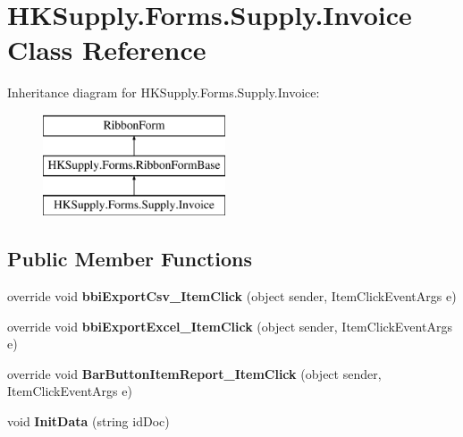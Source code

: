 \hypertarget{class_h_k_supply_1_1_forms_1_1_supply_1_1_invoice}{}\section{H\+K\+Supply.\+Forms.\+Supply.\+Invoice Class Reference}
\label{class_h_k_supply_1_1_forms_1_1_supply_1_1_invoice}
Inheritance diagram for H\+K\+Supply.\+Forms.\+Supply.\+Invoice\+:\begin{figure}[H]
\begin{center}
\leavevmode
\includegraphics[height=3.000000cm]{class_h_k_supply_1_1_forms_1_1_supply_1_1_invoice}
\end{center}
\end{figure}
\subsection*{Public Member Functions}
\begin{DoxyCompactItemize}
\item 
\mbox{\label{class_h_k_supply_1_1_forms_1_1_supply_1_1_invoice_a979428593ea34009a5ba17e72223d4e2}} 
override void {\bfseries bbi\+Export\+Csv\+\_\+\+Item\+Click} (object sender, Item\+Click\+Event\+Args e)
\item 
\mbox{\label{class_h_k_supply_1_1_forms_1_1_supply_1_1_invoice_aa5aeb6cfaf08afaaa507b69647104442}} 
override void {\bfseries bbi\+Export\+Excel\+\_\+\+Item\+Click} (object sender, Item\+Click\+Event\+Args e)
\item 
\mbox{\label{class_h_k_supply_1_1_forms_1_1_supply_1_1_invoice_a3572ffc2114fc9004f7d074f5bf37e6e}} 
override void {\bfseries Bar\+Button\+Item\+Report\+\_\+\+Item\+Click} (object sender, Item\+Click\+Event\+Args e)
\item 
\mbox{\label{class_h_k_supply_1_1_forms_1_1_supply_1_1_invoice_a406fd069dfe625324a39d71e6b2c5657}} 
void {\bfseries Init\+Data} (string id\+Doc)
\end{DoxyCompactItemize}
